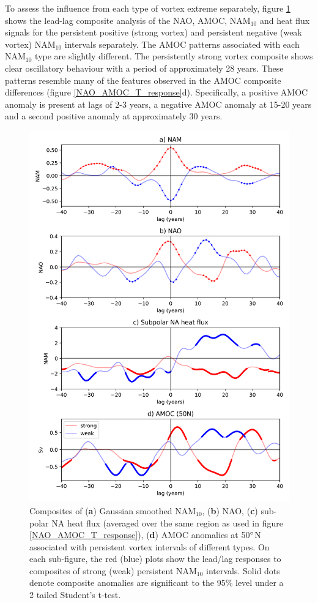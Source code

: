 To assess the influence from each type of vortex extreme separately, figure \ref{NAO_AMOC_response_individual_types} shows the lead-lag composite analysis of the NAO, AMOC, NAM$_{10}$ and heat flux signals for the persistent positive (strong vortex) and persistent negative (weak vortex) NAM$_{10}$ intervals separately. The AMOC patterns associated with each NAM$_{10}$ type are slightly different. The persistently strong vortex composite shows clear oscillatory behaviour with a period of approximately 28 years. These patterns resemble many of the features observed in the AMOC composite differences (figure \ref{NAO_AMOC_T_response}d). Specifically, a positive AMOC anomaly is present at lags of 2-3 years, a negative AMOC anomaly at 15-20 years and a second positive anomaly at approximately 30 years.
\newpage
\begin{figure}[h!]
\begin{center}
\noindent\includegraphics[width =0.6\linewidth]{Figures/Figures-surface/AMOC_NAO_NAM_responses_each_event_type.png}
\caption[Lagged responses to strong and weak NAM$_{10}$ intervals]{Composites of (\textbf{a}) Gaussian smoothed NAM$_{10}$, (\textbf{b}) NAO, (\textbf{c}) sub-polar NA heat flux (averaged over the same region as used in figure \ref{NAO_AMOC_T_response}), (\textbf{d}) AMOC anomalies at 50$\degree$N associated with persistent vortex intervals of different types. On each sub-figure, the red (blue) plots show the lead/lag responses to composites of strong (weak) persistent NAM$_{10}$ intervals. Solid dots denote composite anomalies are significant to the 95\% level under a 2 tailed Student's t-test.}
\label{NAO_AMOC_response_individual_types}
\end{center}
\end{figure}


